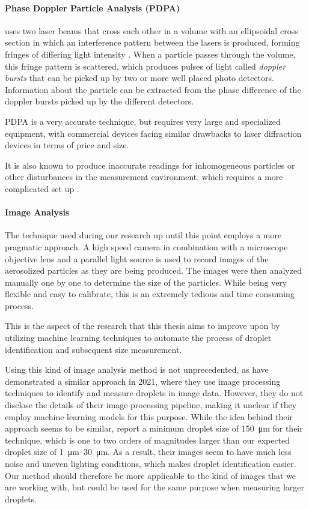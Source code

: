 \paragraph{Phase Doppler Particle Analysis (PDPA)} uses two laser beams that cross each other in a volume with an ellipsoidal cross section in which an interference pattern between the lasers is produced, forming fringes of differing light intensity \cite{hollPARTICLEDEPOSITIONVELOCITIES}.
When a particle passes through the volume, this fringe pattern is scattered, which produces pulses of light called \emph{doppler bursts} that can be picked up by two or more well placed photo detectors.
Information about the particle can be extracted from the phase difference of the doppler bursts picked up by the different detectors.

PDPA is a very accurate technique, but requires very large and specialized equipment, with commercial devices facing similar drawbacks to laser diffraction devices in terms of price and size.

It is also known to produce inaccurate readings for inhomogeneous particles or other disturbances in the measurement environment, which requires a more complicated set up \cite{sijsDropSizeMeasurement2021}.

\paragraph{Image Analysis} 
The technique used during our research up until this point employs a more pragmatic approach. A high speed camera in combination with a microscope objective lens and a parallel light source is used to record images of the aerosolized particles as they are being produced. The images were then analyzed manually one by one to determine the size of the particles. While being very flexible and easy to calibrate, this is an extremely tedious and time consuming process.

This is the aspect of the research that this thesis aims to improve upon by utilizing machine learning techniques to automate the process of droplet identification and subsequent size measurement.

Using this kind of image analysis method is not unprecedented, as \cite{sijsDropSizeMeasurement2021} have demonstrated a similar approach in 2021, where they use image processing techniques to identify and measure droplets in image data. 
However, they do not disclose the details of their image processing pipeline, making it unclear if they employ machine learning models for this purpose.
While the idea behind their approach seems to be similar,  report a minimum droplet size of \SI{150}{\micro\meter} for their technique, which is one to two orders of magnitudes larger than our expected droplet size of \SIrange{1}{30}{\micro\meter}.
As a result, their images seem to have much less noise and uneven lighting conditions, which makes droplet identification easier.
Our method should therefore be more applicable to the kind of images that we are working with, but could be used for the same purpose when measuring larger droplets.

